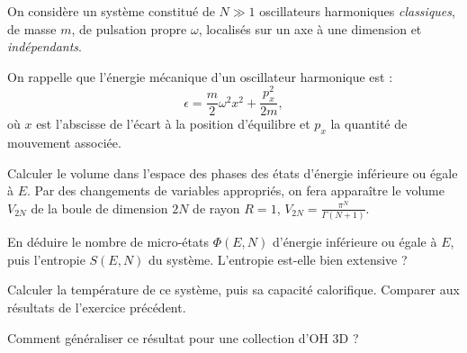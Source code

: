 On considère un système constitué de $N \gg 1$ oscillateurs harmoniques {\it classiques}, de masse $m$, de pulsation propre $\omega$, localisés sur un axe à une dimension et {\it indépendants}.

On rappelle que l'énergie mécanique d'un oscillateur harmonique est :
$$
\epsilon=\frac{m}{2}\omega^2 x^2+\frac{p_x^2}{2m} , \nonumber
$$
où $x$ est l'abscisse de l'écart à la position d'équilibre et $p_x$ la quantité de mouvement associée.

\question
Calculer le volume dans l'espace des phases des états d'énergie inférieure ou égale à $E$. Par des changements de variables appropriés, on fera apparaître le volume $V_{2N}$ de la boule de dimension $2N$ de rayon $R=1$, $V_{2N}=\frac{\pi^N}{\Gamma(N+1)}$.

\question
En déduire le nombre de micro-états $\Phi(E,N)$ d'énergie inférieure ou égale à $E$, puis l'entropie $S(E,N)$ du système. L'entropie est-elle bien extensive ?

\question
Calculer la température de ce système, puis sa capacité calorifique. Comparer aux résultats de l'exercice précédent.

\question
Comment généraliser ce résultat pour une collection d'OH 3D ?
